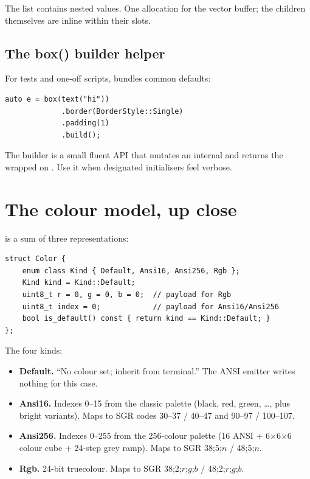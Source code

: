 The  list contains nested  values.
One allocation for the vector buffer; the children themselves are
inline within their slots.

\subsection*{The box() builder helper}

For tests and one-off scripts,  bundles common
defaults:

\begin{lstlisting}
auto e = box(text("hi"))
             .border(BorderStyle::Single)
             .padding(1)
             .build();
\end{lstlisting}

The builder is a small fluent API that mutates an internal
 and returns the wrapped  on
. Use it when designated initialisers feel verbose.

\section{The colour model, up close}

 is a sum of three representations:

\begin{lstlisting}
struct Color {
    enum class Kind { Default, Ansi16, Ansi256, Rgb };
    Kind kind = Kind::Default;
    uint8_t r = 0, g = 0, b = 0;  // payload for Rgb
    uint8_t index = 0;            // payload for Ansi16/Ansi256
    bool is_default() const { return kind == Kind::Default; }
};
\end{lstlisting}

The four kinds:

\begin{itemize}[leftmargin=*]
  \item \textbf{Default.} ``No colour set; inherit from terminal.''
    The ANSI emitter writes nothing for this case.
  \item \textbf{Ansi16.} Indexes 0--15 from the classic palette
    (black, red, green, \ldots, plus bright variants). Maps to
    SGR codes 30--37 / 40--47 and 90--97 / 100--107.
  \item \textbf{Ansi256.} Indexes 0--255 from the 256-colour
    palette (16 ANSI + 6$\times$6$\times$6 colour cube + 24-step
    grey ramp). Maps to SGR 38;5;$n$ / 48;5;$n$.
  \item \textbf{Rgb.} 24-bit truecolour. Maps to
    SGR 38;2;$r$;$g$;$b$ / 48;2;$r$;$g$;$b$.
\end{itemize}

